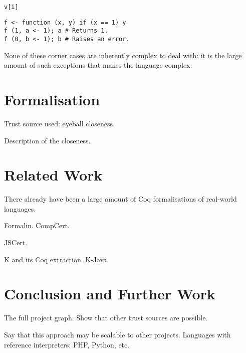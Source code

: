 \documentclass[9pt, sigplan, natbib=false, screen=true]{acmart}
\newcommand\Coq{Coq}
\begin{document}
\begin{verbatim}
v[i]
\end{verbatim}

\begin{verbatim}
f <- function (x, y) if (x == 1) y
f (1, a <- 1); a # Returns 1.
f (0, b <- 1); b # Raises an error.
\end{verbatim}

None of these corner cases are inherently complex to deal with:
it is the large amount of such exceptions that makes the language complex.


\section{Formalisation}
\label{sec:formalisation}

Trust source used: eyeball closeness.

Description of the closeness.


\section{Related Work}
\label{sec:related:work}

There already have been a large amount of \Coq{} formalisations
of real-world languages.

Formalin.
CompCert.

JSCert.

K and its \Coq{} extraction.
K-Java.


\section{Conclusion and Further Work}
\label{sec:conclusion}

The full project graph.
Show that other trust sources are possible.

Say that this approach may be scalable to other projects.
Languages with reference interpreters:
PHP, Python, etc.


\printbibliography
\end{document}
